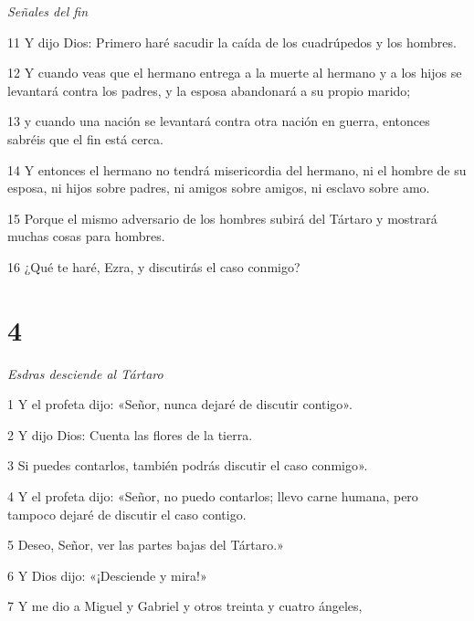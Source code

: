 \par \textit{Señales del fin}

\par 11 Y dijo Dios: Primero haré sacudir la caída de los cuadrúpedos y los hombres.

\par 12 Y cuando veas que el hermano entrega a la muerte al hermano y a los hijos se levantará contra los padres, y la esposa abandonará a su propio marido;

\par 13 y cuando una nación se levantará contra otra nación en guerra, entonces sabréis que el fin está cerca.

\par 14 Y entonces el hermano no tendrá misericordia del hermano, ni el hombre de su esposa, ni hijos sobre padres, ni amigos sobre amigos, ni esclavo sobre amo.

\par 15 Porque el mismo adversario de los hombres subirá del Tártaro y mostrará muchas cosas para hombres.

\par 16 ¿Qué te haré, Ezra, y discutirás el caso conmigo?

\chapter{4}

\par \textit{Esdras desciende al Tártaro}

\par 1 Y el profeta dijo: «Señor, nunca dejaré de discutir contigo».

\par 2 Y dijo Dios: Cuenta las flores de la tierra. 

\par 3 Si puedes contarlos, también podrás discutir el caso conmigo».

\par 4 Y el profeta dijo: «Señor, no puedo contarlos; llevo carne humana, pero tampoco dejaré de discutir el caso contigo.

\par 5 Deseo, Señor, ver las partes bajas del Tártaro.»

\par 6 Y Dios dijo: «¡Desciende y mira!» 

\par 7 Y me dio a Miguel y Gabriel y otros treinta y cuatro ángeles,

